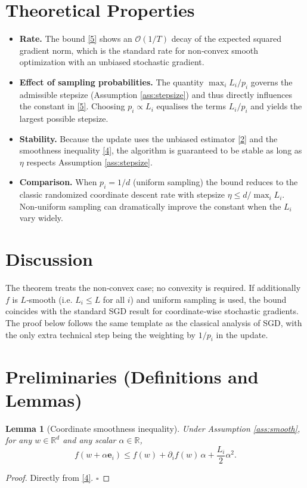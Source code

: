 \documentclass{article}
\newtheorem{lemma}{Lemma}
\newcommand{\R}{\mathbb{R}}
\newcommand{\be}{\mathbf e}
\begin{document}
\section*{Theoretical Properties}
\begin{itemize}
\item \textbf{Rate.} The bound \eqref{5} shows an $\mathcal O(1/T)$ decay of the
expected squared gradient norm, which is the standard rate for
non‑convex smooth optimization with an unbiased stochastic gradient.
\item \textbf{Effect of sampling probabilities.}
The quantity $\max_{i}L_{i}/p_{i}$ governs the admissible stepsize
(Assumption \ref{ass:stepsize}) and thus directly influences the constant in
\eqref{5}. Choosing $p_{i}\propto L_{i}$ equalises the terms $L_{i}/p_{i}$
and yields the largest possible stepsize.
\item \textbf{Stability.}
Because the update uses the unbiased estimator \eqref{2} and the smoothness
inequality \eqref{4}, the algorithm is guaranteed to be stable as long as
$\eta$ respects Assumption \ref{ass:stepsize}.
\item \textbf{Comparison.}
When $p_{i}=1/d$ (uniform sampling) the bound reduces to the classic
randomized coordinate descent rate with stepsize $\eta\le d/\max_{i}L_{i}$.
Non‑uniform sampling can dramatically improve the constant when the $L_{i}$
vary widely.
\end{itemize}

\section*{Discussion}
The theorem treats the non‑convex case; no convexity is required.
If additionally $f$ is $L$‑smooth (i.e. $L_{i}\le L$ for all $i$) and uniform
sampling is used, the bound coincides with the standard SGD result for
coordinate‑wise stochastic gradients. The proof below follows the same
template as the classical analysis of SGD, with the only extra technical
step being the weighting by $1/p_{i}$ in the update.

\newpage
\section*{Preliminaries (Definitions and Lemmas)}
\begin{lemma}[Coordinate smoothness inequality]\label{lem:smooth}
Under Assumption \ref{ass:smooth}, for any $w\in\R^{d}$ and any scalar
$\alpha\in\R$,
\[
f(w+\alpha\be_{i})\le f(w)+\partial_{i}f(w)\,\alpha
+\frac{L_{i}}{2}\alpha^{2}.
\tag{7}
\]
\end{lemma}
\begin{proof}
Directly from \eqref{4}. \hfill $\square$
\end{proof}
\end{document}
